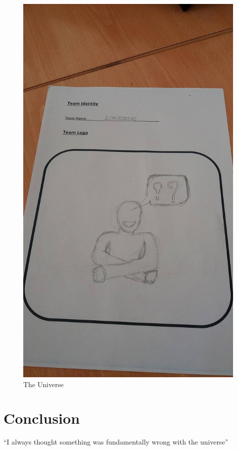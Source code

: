 \documentclass{article}
\begin{document}
\section{}



\begin{figure}[h!]
\centering
\includegraphics[scale=1.7]{logo.jpg}
\caption{The Universe}
\label{fig:univerise}
\end{figure}

\section{Conclusion}
``I always thought something was fundamentally wrong with the universe'' \citep{adams1995hitchhiker}



\end{document}
